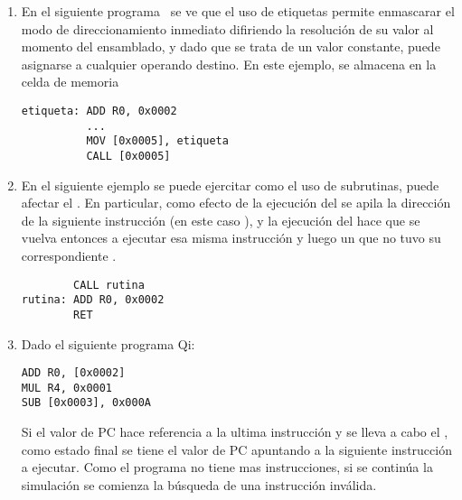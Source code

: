 \begin{enumerate}

\item En el siguiente programa \qi\ se ve que el uso de etiquetas permite enmascarar el modo de direccionamiento inmediato difiriendo la resolución de su valor al momento del ensamblado, y dado que se trata de un valor constante, puede asignarse a cualquier operando destino. En este ejemplo, se almacena en la celda de memoria 

\begin{verbatim}
etiqueta: ADD R0, 0x0002 
          ...
          MOV [0x0005], etiqueta
          CALL [0x0005] 
\end{verbatim}

\item En el siguiente ejemplo se puede ejercitar como el uso de subrutinas, puede afectar el \ciclo. En particular, como efecto de la ejecución del  se apila la dirección de la siguiente instrucción (en este caso ), y la ejecución del  hace que se vuelva entonces a ejecutar esa misma instrucción y luego un  que no tuvo su correspondiente .

\begin{verbatim}
        CALL rutina 
rutina: ADD R0, 0x0002 
        RET 
\end{verbatim}



\item Dado el siguiente programa Qi:

\begin{verbatim}
ADD R0, [0x0002]
MUL R4, 0x0001
SUB [0x0003], 0x000A 
\end{verbatim}

Si el valor de PC hace referencia a la ultima instrucción y se lleva a cabo el \ciclo, como estado final se tiene el valor de PC apuntando a la siguiente instrucción a ejecutar. Como el programa no tiene mas instrucciones, si se continúa la simulación se comienza la búsqueda de una instrucción inválida.

\end{enumerate} 

